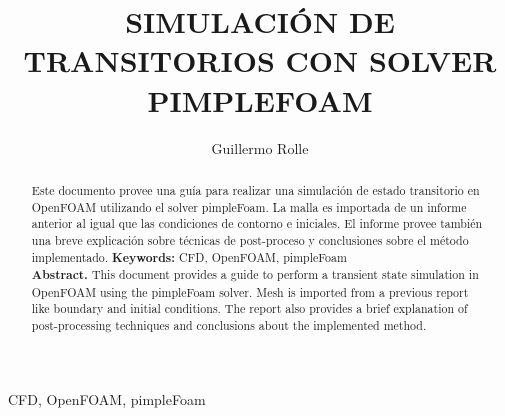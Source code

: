 \documentclass[oneside,a4paper,spanish,links]{amca}
\title{SIMULACIÓN DE TRANSITORIOS CON SOLVER PIMPLEFOAM}
\author[a]{Guillermo Rolle}
\begin{document}
\vspace{3cm}

\maketitle


\bigskip
\bigskip
\bigskip
\bigskip
\begin{keywords}
CFD, OpenFOAM, pimpleFoam 
\end{keywords}

\begin{abstract}
Este documento provee una guía para realizar una simulación de estado transitorio en OpenFOAM utilizando el solver pimpleFoam. La malla es importada de un informe anterior al igual que las condiciones de contorno e iniciales. El informe provee también una breve explicación sobre técnicas de post-proceso y conclusiones sobre el método implementado.
\linebreak
%
\linebreak
%
\textbf{Keywords:} CFD, OpenFOAM, pimpleFoam\\
%
\linebreak
%
\textbf{Abstract.}
This document provides a guide to perform a transient state simulation in OpenFOAM using the pimpleFoam solver. Mesh is imported from a previous report like boundary and initial conditions. The report also provides a brief explanation of post-processing techniques and conclusions about the implemented method. 

\end{abstract}
\end{document}
